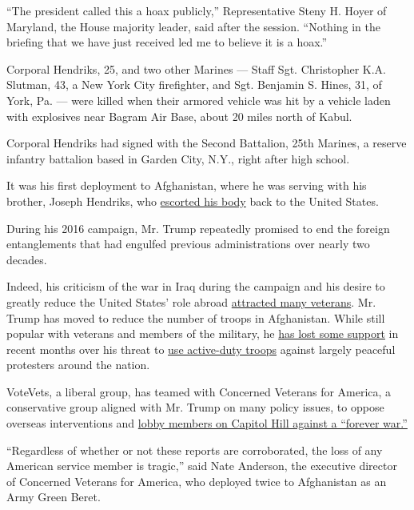 ``The president called this a hoax publicly,'' Representative Steny H.
Hoyer of Maryland, the House majority leader, said after the session.
``Nothing in the briefing that we have just received led me to believe
it is a hoax.''

Corporal Hendriks, 25, and two other Marines --- Staff Sgt. Christopher
K.A. Slutman, 43, a New York City firefighter, and Sgt. Benjamin S.
Hines, 31, of York, Pa. --- were killed when their armored vehicle was
hit by a vehicle laden with explosives near Bagram Air Base, about 20
miles north of Kabul.

Corporal Hendriks had signed with the Second Battalion, 25th Marines, a
reserve infantry battalion based in Garden City, N.Y., right after high
school.

It was his first deployment to Afghanistan, where he was serving with
his brother, Joseph Hendriks, who
\href{https://www.newsday.com/long-island/nassau/robert-hendriks-marine-locust-valley-roadside-bomb-1.30154053}{escorted
his body} back to the United States.

During his 2016 campaign, Mr. Trump repeatedly promised to end the
foreign entanglements that had engulfed previous administrations over
nearly two decades.

Indeed, his criticism of the war in Iraq during the campaign and his
desire to greatly reduce the United States' role abroad
\href{https://www.nytimes.com/2019/11/01/us/politics/veterans-trump-iraq-afghanistan.html}{attracted
many veterans}. Mr. Trump has moved to reduce the number of troops in
Afghanistan. While still popular with veterans and members of the
military, he
\href{https://www.nytimes.com/2020/06/12/us/politics/trump-polls-military-approval.html}{has
lost some support} in recent months over his threat to
\href{https://www.nytimes.com/2020/06/04/us/politics/trump-military-protests.html}{use
active-duty troops} against largely peaceful protesters around the
nation.

VoteVets, a liberal group, has teamed with Concerned Veterans for
America, a conservative group aligned with Mr. Trump on many policy
issues, to oppose overseas interventions and
\href{https://www.nytimes.com/2019/03/16/us/politics/vote-vets-concerned-veterans-america.html}{lobby
members on Capitol Hill against a ``forever war.''}

``Regardless of whether or not these reports are corroborated, the loss
of any American service member is tragic,'' said Nate Anderson, the
executive director of Concerned Veterans for America, who deployed twice
to Afghanistan as an Army Green Beret.

